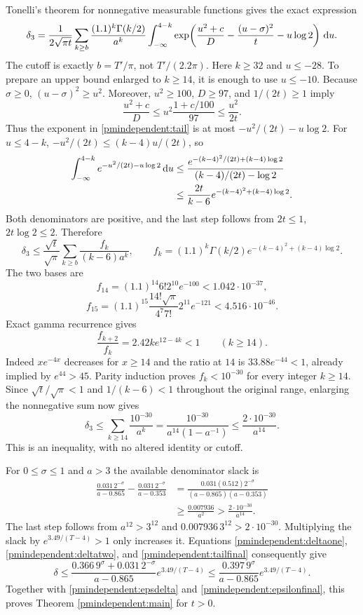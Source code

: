 \documentclass[11pt]{article}
\begin{document}
Tonelli's theorem for nonnegative measurable functions gives the
exact expression
\begin{equation}\label{pmindependent:tail}
 \delta_3=\frac1{2\sqrt{\pi t}}
 \sum_{k\ge b}\frac{(1.1)^k\Gamma(k/2)}{a^k}
 \int_{-\infty}^{4-k}
 \exp\!\left(\frac{u^2+c}D-\frac{(u-\sigma)^2}t-u\log2\right)\,\mathrm d u.
\end{equation}
The cutoff is exactly $b=T'/\pi$, not $T'/(2.2\pi)$.
Here $k\ge32$ and $u\le-28$. To prepare an upper bound enlarged
to $k\ge14$, it is enough to use $u\le-10$. Because $\sigma\ge0$,
$(u-\sigma)^2\ge u^2$. Moreover, $u^2\ge100$, $D\ge97$,
and $1/(2t)\ge1$ imply
\[
 \frac{u^2+c}D
 \le u^2\frac{1+c/100}{97}\le\frac{u^2}{2t}.
\]
Thus the exponent in \eqref{pmindependent:tail} is at most
$-u^2/(2t)-u\log2$. For $u\le4-k$,
$-u^2/(2t)\le(k-4)u/(2t)$, so
\begin{align*}
 \int_{-\infty}^{4-k}e^{-u^2/(2t)-u\log2}\,\mathrm d u
 &\le\frac{e^{-(k-4)^2/(2t)+(k-4)\log2}}
                {(k-4)/(2t)-\log2}\\
 &\le\frac{2t}{k-6}e^{-(k-4)^2+(k-4)\log2}.
\end{align*}
Both denominators are positive, and the last step follows from
$2t\le1$, $2t\log2\le2$. Therefore
\[
 \delta_3\le\frac{\sqrt t}{\sqrt\pi}
 \sum_{k\ge b}\frac{f_k}{(k-6)a^k},\qquad
 f_k=(1.1)^k\Gamma(k/2)e^{-(k-4)^2+(k-4)\log2}.
\]
The two bases are
\[
 f_{14}=(1.1)^{14}6!2^{10}e^{-100}<1.042\cdot10^{-37},
\]
\[
 f_{15}=(1.1)^{15}\frac{14!\sqrt\pi}{4^7 7!}2^{11}e^{-121}
                                         <4.516\cdot10^{-46}.
\]
Exact gamma recurrence gives
\[
 \frac{f_{k+2}}{f_k}=2.42k e^{12-4k}<1\qquad(k\ge14).
\]
Indeed $x e^{-4x}$ decreases for $x\ge14$ and the ratio at $14$
is $33.88e^{-44}<1$, already implied by $e^{44}>45$.
Parity induction proves $f_k<10^{-30}$ for every integer $k\ge14$.
Since $\sqrt t/\sqrt\pi<1$ and $1/(k-6)<1$ throughout the
original range, enlarging the nonnegative sum now gives
\begin{equation}\label{pmindependent:tailfinal}
 \delta_3\le\sum_{k\ge14}\frac{10^{-30}}{a^k}
 =\frac{10^{-30}}{a^{14}(1-a^{-1})}
 \le\frac{2\cdot10^{-30}}{a^{14}}.
\end{equation}
This is an inequality, with no altered identity or cutoff.

For $0\le\sigma\le1$ and $a>3$ the available denominator slack is
\begin{align*}
 \frac{0.031\,2^{-\sigma}}{a-0.865}
 -\frac{0.031\,2^{-\sigma}}{a-0.353}
 &=\frac{0.031(0.512)2^{-\sigma}}
          {(a-0.865)(a-0.353)}\\
 &\ge\frac{0.007936}{a^2}
 >\frac{2\cdot10^{-30}}{a^{14}}.
\end{align*}
The last step follows from $a^{12}>3^{12}$ and
$0.007936\,3^{12}>2\cdot10^{-30}$. Multiplying the slack by
$e^{3.49/(T-4)}>1$ only increases it. Equations \eqref{pmindependent:deltaone},
\eqref{pmindependent:deltatwo}, and \eqref{pmindependent:tailfinal} consequently give
\[
 \delta\le\frac{0.366\,9^\sigma+0.031\,2^{-\sigma}}{a-0.865}
                       e^{3.49/(T-4)}
 \le\frac{0.397\,9^\sigma}{a-0.865}e^{3.49/(T-4)}.
\]
Together with \eqref{pmindependent:epsdelta} and \eqref{pmindependent:epsilonfinal}, this proves
Theorem \ref{pmindependent:main} for $t>0$.
\end{document}
